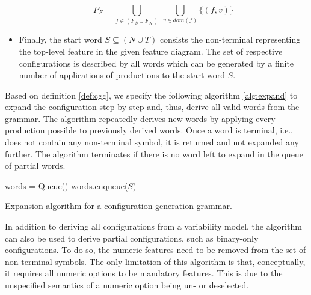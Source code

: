 \begin{definition}
\begin{itemize}
  \begin{equation}
  P_F = \bigcup_{f \in (F_\mathcal{B} \cup F_\mathcal{N})} ~ \bigcup_{v \in
  dom(f)} \lbrace (f, v) \rbrace
  \end{equation}
	
  \item Finally, the start word $S \subseteq (N \cup T)$ consists the
  non-terminal representing the top-level feature in the given feature diagram.
  The set of respective configurations is described by all words which can be
  generated by a finite number of applications of productions to the start word
  $S$.
  
  \end{itemize}
\end{definition}

Based on definition \ref{def:cgg}, we specify the following algorithm
\ref{alg:expand} to expand the configuration step by step and, thus, derive all valid words from the
grammar. The algorithm repeatedly derives new words by applying every production
possible to previously derived words. Once a word is terminal, i.e., does not
contain any non-terminal symbol, it is returned and not expanded any further.
The algorithm terminates if there is no word left to expand in the queue of
partial words.\\

\begin{algorithm}[H]\label{alg:expand}
 \vspace{5mm}
 words = Queue()\;
 words.enqueue($S$)\;
 
 \caption{Expansion algorithm for a configuration generation grammar.}
\end{algorithm}\vspace{2mm}

In addition to deriving all configurations from a variability model, the
algorithm can also be used to derive partial configurations, such as
binary-only configurations. To do so, the numeric features need to be removed
from the set of non-terminal symbols. The only limitation of this algorithm is
that, conceptually, it requires all numeric options to be mandatory features.
This is due to the unspecified semantics of a numeric option being un- or
deselected.

